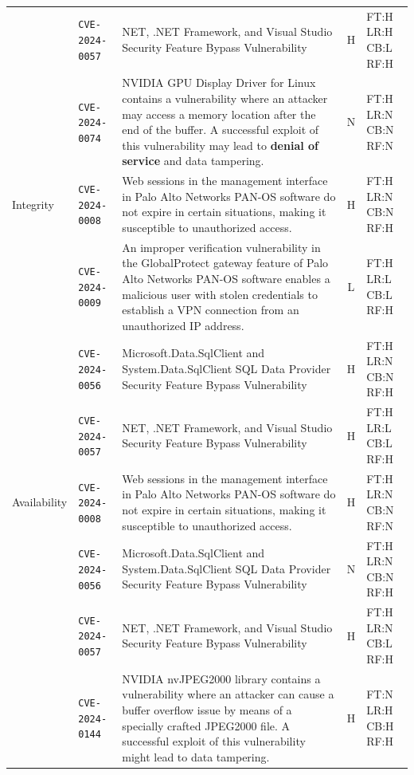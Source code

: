 \begin{table}[p]
\begin{tabular}{@{}llp{6.2cm}cl@{}}
 & \texttt{CVE-2024-0057} & NET, .NET Framework, and Visual Studio Security Feature Bypass Vulnerability & H & FT:H LR:H CB:L RF:H \\
 & \texttt{CVE-2024-0074} & NVIDIA GPU Display Driver for Linux contains a vulnerability where an attacker may access a memory location after the end of the buffer. A successful exploit of this vulnerability may lead to \textbf{denial of service} and data tampering. & N & FT:H LR:N CB:N RF:N \\
\addlinespace[3pt]
Integrity & \texttt{CVE-2024-0008} & Web sessions in the management interface in Palo Alto Networks PAN-OS software do not expire in certain situations, making it susceptible to unauthorized access. & H & FT:H LR:N CB:N RF:H \\
 & \texttt{CVE-2024-0009} & An improper verification vulnerability in the GlobalProtect gateway feature of Palo Alto Networks PAN-OS software enables a malicious user with stolen credentials to establish a VPN connection from an unauthorized IP address. & L & FT:H LR:L CB:L RF:H \\
 & \texttt{CVE-2024-0056} & Microsoft.Data.SqlClient and System.Data.SqlClient SQL Data Provider Security Feature Bypass Vulnerability & H & FT:H LR:N CB:N RF:H \\
 & \texttt{CVE-2024-0057} & NET, .NET Framework, and Visual Studio Security Feature Bypass Vulnerability & H & FT:H LR:L CB:L RF:H \\
\addlinespace[3pt]
Availability & \texttt{CVE-2024-0008} & Web sessions in the management interface in Palo Alto Networks PAN-OS software do not expire in certain situations, making it susceptible to unauthorized access. & H & FT:H LR:N CB:N RF:N \\
 & \texttt{CVE-2024-0056} & Microsoft.Data.SqlClient and System.Data.SqlClient SQL Data Provider Security Feature Bypass Vulnerability & N & FT:H LR:N CB:N RF:H \\
 & \texttt{CVE-2024-0057} & NET, .NET Framework, and Visual Studio Security Feature Bypass Vulnerability & H & FT:H LR:N CB:L RF:H \\
 & \texttt{CVE-2024-0144} & NVIDIA nvJPEG2000 library contains a vulnerability where an attacker can cause a buffer overflow issue by means of a specially crafted JPEG2000 file. A successful exploit of this vulnerability might lead to data tampering. & H & FT:N LR:H CB:H RF:H \\
\bottomrule
\end{tabular}
\end{table}

